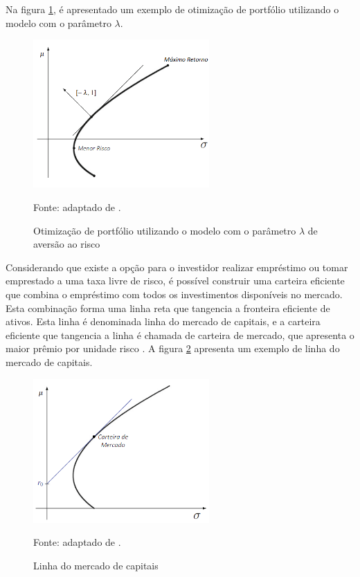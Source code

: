                     \ipar Na figura \ref{fig:aversao}, é apresentado um exemplo de otimização de portfólio utilizando o modelo com o parâmetro $\lambda$.

                    \begin{figure}[H]
                        \centering
                        \caption{Otimização de portfólio utilizando o modelo com o parâmetro $\lambda$ de aversão ao risco}
                        \label{fig:aversao}
                        \includegraphics[width=0.6\textwidth]{imagens/aversao.png}
                        \par \footnotesize Fonte: adaptado de .
                    \end{figure}

                    \ipar Considerando que existe a opção para o investidor realizar empréstimo ou tomar emprestado a uma taxa livre de risco, é possível construir uma carteira eficiente que combina o empréstimo com todos os investimentos disponíveis no mercado. Esta combinação forma uma linha reta que tangencia a fronteira eficiente de ativos. Esta linha é denominada linha do mercado de capitais, e a carteira eficiente que tangencia a linha é chamada de carteira de mercado, que apresenta o maior prêmio por unidade risco \cite{sharpe1964capital}. A figura \ref{fig:carteira_de_mercado} apresenta um exemplo de linha do mercado de capitais.

                    \begin{figure}[H]
                        \centering
                        \caption{Linha do mercado de capitais}
                        \label{fig:carteira_de_mercado}
                        \includegraphics[width=0.6\textwidth]{imagens/carteira_de_mercado.png}
                        \par \footnotesize Fonte: adaptado de .
                    \end{figure}

